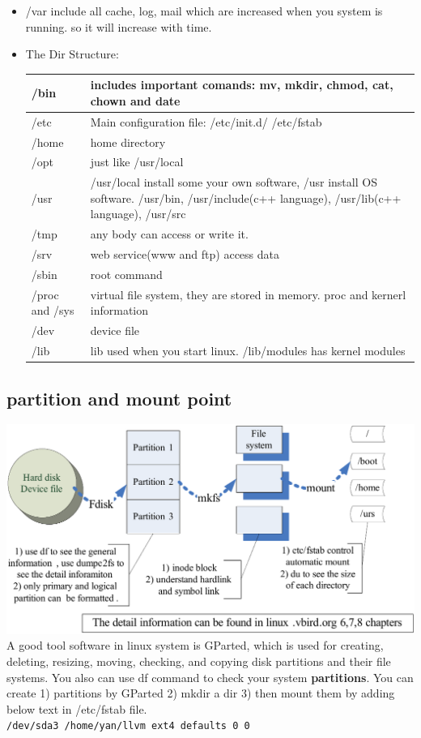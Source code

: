 \documentclass[a4paper,12pt,twoside]{book}
\begin{document}
\begin{itemize}
         \item /var include all cache, log, mail which are increased when you system is running. so it will increase with time. 
         
     \item The Dir Structure:\\
\begin{tabular}{p{}|p{}}
  \hline
  /bin & includes important comands: mv, mkdir, chmod, cat, chown and date  \\
 \hline  /etc & Main configuration file: /etc/init.d/ /etc/fstab \\
  \hline /home & home directory \\
  \hline /opt & just like /usr/local  \\
  \hline /usr & /usr/local install some your own software, /usr install OS software.  /usr/bin, /usr/include(c++ language), /usr/lib(c++ language),  /usr/src \\
  \hline /tmp & any body can access or write it.     \\
  \hline /srv & web service(www and ftp) access data \\
  \hline /sbin & root command \\
  \hline /proc and /sys & virtual file system, they are stored in memory.  proc and kernerl information \\
  \hline /dev & device file \\
  \hline /lib & lib used when you start linux. /lib/modules has kernel modules \\
  \hline 
\end{tabular}

\end{itemize} 
\subsection{partition and mount point}
	\includegraphics[scale=0.8]{pics/basic_file_system_clip}
	\\ 
   A good tool software in linux system is GParted, which  is used for creating, deleting, resizing, moving, checking, and copying disk partitions and their file systems.  You also can use df command to check your system \textbf{partitions}. You can create 1) partitions by GParted 2) mkdir a dir 3) then mount them by adding below text in /etc/fstab file.    \\   
   \verb=/dev/sda3 /home/yan/llvm ext4 defaults 0 0=
   
\end{document}
